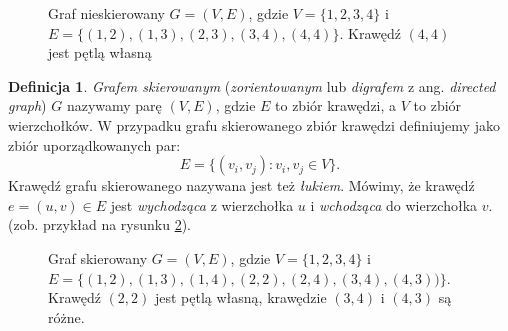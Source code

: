 \documentclass[12pt,a4paper]{book}
\theoremstyle{definition}
\newtheorem{de}{Definicja}[chapter]
\numberwithin{equation}{chapter}
\begin{document}
\begin{figure}[H]
\centering
{}
\caption{Graf nieskierowany $G =(V,E)$, gdzie $V = \{1,2,3,4\}$ i~$E = \big\{(1,2),(1,3),(2,3),(3,4),(4,4)\big\}$. Krawędź $(4,4)$ jest pętlą własną}
\label{rys_graf_niesk}
\end{figure}

\begin{de}
\textit{Grafem skierowanym} (\textit{zorientowanym} lub \textit{digrafem} z ang. \textit{directed graph}) $G$ nazywamy parę $(V, E)$, gdzie $E$ to zbiór krawędzi, a $V$ to zbiór wierzchołków. W przypadku grafu skierowanego zbiór krawędzi definiujemy jako zbiór uporządkowanych par:
$$
E = \big\{ (v_{i}, v_{j})\colon v_i, v_j\in V\big\}.
$$
Krawędź grafu skierowanego nazywana jest też \textit{łukiem}. Mówimy, że krawędź~$e=(u,v)\in E$ jest \textit{wychodząca} z wierzchołka $u$ i \textit{wchodząca} do wierzchołka $v$. (zob. przykład na rysunku \ref{rys_graf_sk}).
\end{de}

\begin{figure}[!htp]
\centering
{}

\caption{
Graf skierowany $G =(V,E)$, gdzie $V = \{1,2,3,4\}$ i $E = \big\{(1,2),(1,3),(1,4),(2,2),(2,4),(3,4),(4,3))\big\}$. Krawędź $(2,2)$ jest pętlą własną, krawędzie $(3,4)$ i $(4,3)$ są różne.}
\label{rys_graf_sk}
\end{figure}
\end{document}

